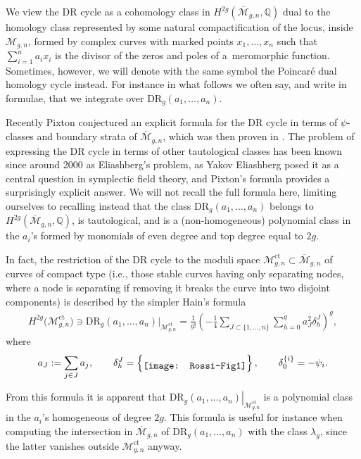 \documentclass[pdftex]{sigma}
\numberwithin{equation}{section}
\newcommand{\oM}{\overline{\mathcal M}}
\def\mbQ{{\mathbb Q}}
\newcommand{\<}{\left<}
\renewcommand{\>}{\right>}
\newcommand{\DR}{\mathrm{DR}}
\begin{document}
We view the DR cycle as a cohomology class in $H^{2g}(\oM_{g,n},\mbQ)$ dual to the homology class represented by some natural compactif\/ication of the locus, inside $\mathcal{M}_{g,n}$, formed by complex curves with marked points $x_1,\dots,x_n$ such that $\sum\limits_{i=1}^n a_i x_i$ is the divisor of the zeros and poles of a~meromorphic function. Sometimes, however, we will denote with the same symbol the Poincar\'e dual homology cycle instead. For instance in what follows we often say, and write in formulae, that we integrate over $\DR_g(a_1,\dots,a_n)$.

Recently Pixton conjectured an explicit formula for the DR cycle in terms of $\psi$-classes and boundary strata of $\oM_{g,n}$, which was then proven in \cite{JPPZ16}. The problem of expressing the DR cycle in terms of other tautological classes has been known since around 2000 as Eliashberg's problem, as Yakov Eliashberg posed it as a central question in symplectic f\/ield theory, and Pixton's formula provides a surprisingly explicit answer. We will not recall the full formula here, limiting ourselves to recalling instead that the class $\DR_g(a_1,\dots,a_n)$ belongs to $H^{2g}(\oM_{g,n},\mbQ)$, is tautological, and is a (non-homogeneous) polynomial class in the $a_i$'s formed by monomials of even degree and top degree equal to $2g$.

In fact, the restriction of the DR cycle to the moduli space $\mathcal{M}_{g,n}^{\text{ct}}\subset \oM_{g,n}$ of curves of compact type (i.e., those stable curves having only separating nodes, where a node is separating if removing it breaks the curve into two disjoint components) is described by the simpler Hain's formula \cite{Hai11}
\begin{gather*}H^{2g}\big(\mathcal{M}_{g,n}^{\text{ct}}\big)\ni \DR_g(a_1,\dots,a_n)\big|_{\mathcal{M}_{g,n}^{\text{ct}}} = \frac{1}{g!}\left( -\frac{1}{4} \sum_{J\subset \{1,\dots,n\}} \sum_{h=0}^g a_{J}^2 \delta^J_h \right)^{g},\end{gather*}
where
\begin{gather*}a_J := \sum_{j\in J} a_j , \qquad\delta^J_h = \left\{ \raisebox{-0.42\height}{\texttt{[image: Rossi-Fig1]}}
\right\}, \qquad \delta^{\{i\}}_0 = - \psi_i.\end{gather*}

From this formula it is apparent that $\left. \DR_g(a_1,\dots,a_n)\right|_{\mathcal{M}_{g,n}^{\text{ct}}}$ is a polynomial class in the $a_i$'s homogeneous of degree $2g$. This formula is useful for instance when computing the intersection in $\oM_{g,n}$ of $\DR_g(a_1,\dots,a_n)$ with the class $\lambda_g$, since the latter vanishes outside $\mathcal{M}_{g,n}^{\text{ct}}$ anyway.
\end{document}
